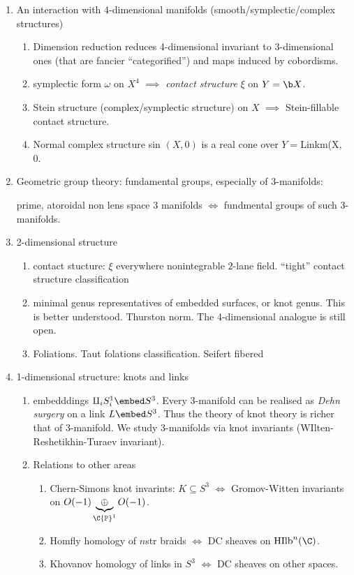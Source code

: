 \documentclass[a4paper]{article}
\renewcommand{\P}{{\mathbb P}}
\begin{document}
\begin{enumerate}
\item An interaction with 4-dimensional manifolds (smooth/symplectic/complex structures)
\begin{enumerate}
\item Dimension reduction reduces 4-dimensional invariant to 3-dimensional ones (that are fancier ``categorified'') and maps induced by cobordisms.
\item symplectic form \(\omega\) on \(X^4\) \(\implies\) \emph{contact structure} \(\xi\) on \(Y = \b X\).
\item Stein structure (complex/symplectic structure) on \(X\) \(\implies\) Stein-fillable contact structure.
\item Normal complex structure sin \((X, 0)\) is a real cone over \(Y = \)Linkm(X, 0.
\end{enumerate}

\item Geometric group theory: fundamental groups, especially of 3-manifolds:

prime, atoroidal non lens space 3 manifolds \(\iff\) fundmental groups of such 3-manifolds.

\item 2-dimensional structure
  \begin{enumerate}
  \item contact stucture: \(\xi\) everywhere nonintegrable \(2\)-lane field. ``tight'' contact structure classification
  \item minimal genus representatives of embedded surfaces, or knot genus. This is better understood. Thurston norm. The 4-dimensional analogue is still open.
  \item Foliations. Taut folations classification. Seifert fibered
  \end{enumerate}

\item 1-dimensional structure: knots and links
  \begin{enumerate}
  \item embedddings \(\amalg_i S^1_i \embed S^3\). Every 3-manifold can be realised as \emph{Dehn surgery} on  a link \(L \embed S^3\). Thus the theory of knot theory is richer that of 3-manifold. We study 3-manifolds via knot invariants (WIlten-Reshetikhin-Turaev invariant).
  \item Relations to other areas
    \begin{enumerate}
    \item Chern-Simons knot invarints: \(K \subseteq S^3\) \(\iff\) Gromov-Witten invariants on \(O(-1) \underbrace{\oplus}_{\C\P^1} O(-1)\).
    \item Homfly homology of \(n\)str braids \(\iff\) DC sheaves on \(\operatorname{HIlb}^n(\C)\).
    \item Khovanov homology of links in \(S^3\) \(\iff\) DC sheaves on other spaces.
    \end{enumerate}
  \end{enumerate}
\end{enumerate}
\end{document}
